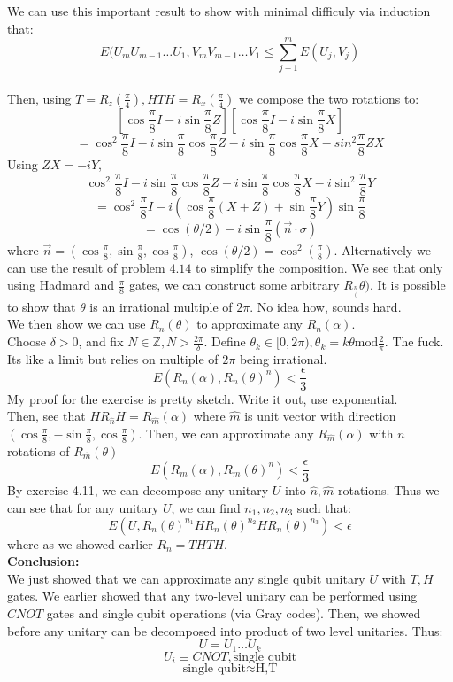 \documentclass{article}
\begin{document}
We can use this important result to show with minimal difficuly via induction that:
$$E(U_m U_{m-1} \dots U_1, V_m V_{m-1}\dots V_1 \leq \sum^m_{j-1} E(U_j, V_j)$$\\
Then, using $T = R_z(\frac{\pi}{4}), HTH = R_x(\frac{\pi}{4})$ we compose the two rotations to:
$$[\cos \frac{\pi}{8} I - i \sin \frac{\pi}{8}Z][ \cos \frac{\pi}{8} I - i \sin \frac{\pi}{8}X]$$
$$= \cos^2 \frac{\pi}{8} I - i \sin \frac{\pi}{8} \cos \frac{\pi}{8} Z  -i \sin \frac{\pi}{8} \cos \frac{\pi}{8} X - sin^2 \frac{\pi}{8} ZX$$
Using $ZX = -iY$,
$$  \cos^2 \frac{\pi}{8} I - i \sin \frac{\pi}{8} \cos \frac{\pi}{8} Z  -i \sin \frac{\pi}{8} \cos \frac{\pi}{8} X -i \sin^2 \frac{\pi}{8}Y $$
$$ = \cos^2 \frac{\pi}{8}I  -i(\cos \frac{\pi}{8}(X+Z) + \sin \frac{\pi}{8} Y) \sin\frac{\pi}{8}$$
$$ = \cos(\theta/2) - i \sin \frac{\pi}{8}(\vec{n} \cdot \sigma)$$
where $\vec{n} = (\cos \frac{\pi}{8}, \sin \frac{\pi}{8}, \cos \frac{\pi}{8})$, $\cos (\theta/2) = \cos^2 (\frac{\pi}{8})$.
Alternatively we can use the result of problem $4.14$ to simplify the composition. We see that only using Hadmard and $\frac{\pi}{8}$ gates, we can construct some arbitrary $R_\frac{n} (\theta)$. It is possible to show that $\theta$ is an irrational multiple of $2\pi$. No idea how, sounds hard.\\
We then show we can use $R_n(\theta)$ to approximate any $R_n (\alpha)$.\\
Choose $\delta > 0$, and fix $N \in \mathbb{Z}, N > \frac{2\pi}{\delta}$. Define $\theta_k \in [0, 2\pi), \theta_k = k\theta \text{mod} \frac{2}{\pi}$. The fuck. Its like a limit but relies on multiple of $2\pi$ being irrational.
$$E(R_n(\alpha), R_n(\theta)^n) < \frac{\epsilon}{3}$$ 
My proof for the exercise is pretty sketch. Write it out, use exponential.\\
Then, see that $H R_{\hat{n}} H = R_{\hat{m}} (\alpha)$ where $\hat{m}$ is unit vector with direction $(\cos \frac{\pi}{8}, - \sin \frac{\pi}{8}, \cos \frac{\pi}{8})$. Then, we can approximate any $R_{\hat{m}} (\alpha)$ with $n$ rotations of $R_{\hat{m}}(\theta)$
$$E(R_m(\alpha), R_m(\theta)^n) < \frac{\epsilon}{3}$$
By exercise 4.11, we can decompose any unitary $U$ into $\hat{n},\hat{m}$ rotations.
Thus we can see that for any unitary $U$, we can find $n_1, n_2, n_3$ such that:
$$E(U, R_n(\theta)^{n_1} H R_n(\theta)^{n_2}H R_n(\theta)^{n_3}) < \epsilon$$ where as we showed earlier $R_n = T HTH$.\\
\textbf{Conclusion:}\\
We just showed that we can approximate any single qubit unitary $U$ with $T, H$ gates. We earlier showed that any two-level unitary can be performed using $CNOT$ gates and single qubit operations (via Gray codes). Then, we showed before any unitary can be decomposed into product of two level unitaries.
Thus:
$$ U = U_1 \dots U_{k}$$
$$U_i \equiv CNOT, \text{single qubit}$$
$$ \text{single qubit} \approx \text{H,T}$$
\end{document}
